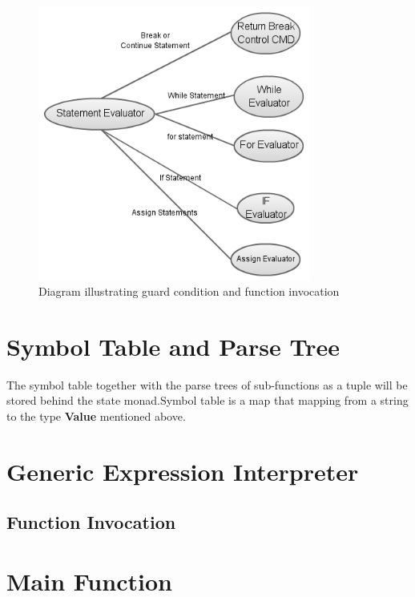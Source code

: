 \begin{figure}[H]
  \centering
	\includegraphics[width=0.80\textwidth]{pic/c6/statement.png}
	\caption{Diagram illustrating guard condition and function invocation}
\end{figure}




\section{Symbol Table and Parse Tree}
The symbol table together with the parse trees of sub-functions as a tuple will be stored behind the state monad.Symbol table is a map that mapping from a string to the type \textbf{Value} mentioned above.


\section{Generic Expression Interpreter}

\subsection{Function Invocation}
\section{Main Function}